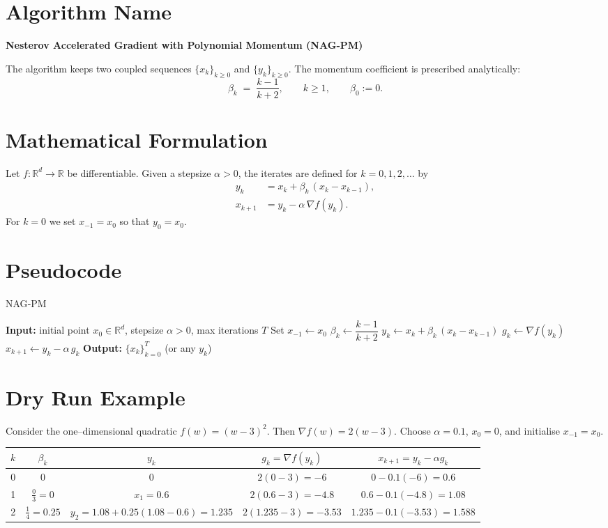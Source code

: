 \documentclass{article}
\newcommand{\R}{\mathbb{R}}
\begin{document}
\section*{Algorithm Name}
\textbf{Nesterov Accelerated Gradient with Polynomial Momentum (NAG‑PM)}  

The algorithm keeps two coupled sequences $\{x_k\}_{k\ge 0}$ and $\{y_k\}_{k\ge 0}$.
The momentum coefficient is prescribed analytically:
\[
\beta_k\;=\;\frac{k-1}{k+2},\qquad k\ge 1,\qquad \beta_0:=0 .
\]

\section*{Mathematical Formulation}
Let $f:\R^d\rightarrow\R$ be differentiable.  
Given a stepsize $\alpha>0$, the iterates are defined for $k=0,1,2,\dots$ by
\begin{align}
y_k &= x_k + \beta_k\,(x_k-x_{k-1}), \tag{1}\\
x_{k+1} &= y_k - \alpha\,\nabla f(y_k). \tag{2}
\end{align}
For $k=0$ we set $x_{-1}=x_0$ so that $y_0=x_0$.

\section*{Pseudocode}
\begin{algorithm}[H]
\caption{NAG‑PM}
\begin{algorithmic}[1]
\State \textbf{Input:} initial point $x_0\in\R^d$, stepsize $\alpha>0$, max iterations $T$
\State Set $x_{-1}\gets x_0$
    \State $\beta_k \gets \dfrac{k-1}{k+2}$ 
    \State $y_k \gets x_k + \beta_k\,(x_k-x_{k-1})$ 
    \State $g_k \gets \nabla f(y_k)$
    \State $x_{k+1} \gets y_k - \alpha\, g_k$ 
\EndFor
\State \textbf{Output:} $\{x_k\}_{k=0}^{T}$ (or any $y_k$)
\end{algorithmic}
\end{algorithm}

\section*{Dry Run Example}
Consider the one–dimensional quadratic $f(w)=(w-3)^2$.  
Then $\nabla f(w)=2(w-3)$.  Choose $\alpha=0.1$, $x_0=0$, and initialise $x_{-1}=x_0$.

\begin{center}
\begin{tabular}{c|c|c|c|c}
$k$ & $\beta_k$ & $y_k$ & $g_k=\nabla f(y_k)$ & $x_{k+1}=y_k-\alpha g_k$ \\ \hline
0 & $0$ & $0$ & $2(0-3)=-6$ & $0-0.1(-6)=0.6$ \\ \hline
1 & $\frac{0}{3}=0$ & $x_1=0.6$ & $2(0.6-3)=-4.8$ & $0.6-0.1(-4.8)=1.08$ \\ \hline
2 & $\frac{1}{4}=0.25$ & $y_2=1.08+0.25(1.08-0.6)=1.235$ & $2(1.235-3)=-3.53$ & $1.235-0.1(-3.53)=1.588$ 
\end{tabular}
\end{center}
\end{document}
